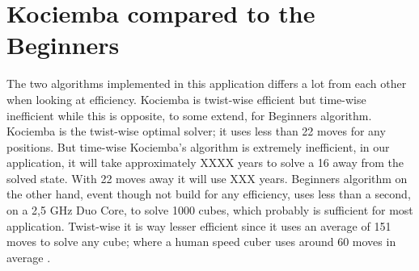 \section{Kociemba compared to the Beginners}
The two algorithms implemented in this application differs a lot from each other when looking at efficiency. 
Kociemba is twist-wise efficient but time-wise inefficient while this is opposite, to some extend, for Beginners algorithm. 
Kociemba is the twist-wise optimal solver; it uses less than 22 moves for any positions. 
But time-wise Kociemba's algorithm is extremely inefficient, in our application, it will take approximately XXXX years to solve a \cube{} 16 \twist{} away from the solved state. 
With 22 moves away it will use XXX years. 
Beginners algorithm on the other hand, event though not build for any efficiency, uses less than a second, on a 2,5 GHz Duo Core, to solve 1000 cubes, which probably is sufficient for most application. 
Twist-wise it is way lesser efficient since it uses an average of 151 moves to solve any cube; where a human speed cuber uses around 60 moves in average \cite{larsPetrus97} \cite{cubeFreak}.
